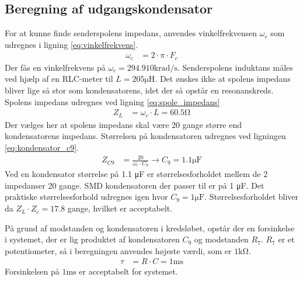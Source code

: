 \subsection{Beregning af udgangskondensator}
For at kunne finde senderspolens impedans, anvendes vinkelfrekvensen $\omega_c$ som udregnes i ligning \ref{eq:vinkelfrekvens}.
\begin{align}
	\omega_c & = 2 \cdot \pi \cdot F_c \label{eq:vinkelfrekvens}
\end{align}
Der fås en vinkelfrekvens på $\omega_c = 294.910 \si{\kilo\radian\per\second}$.
Senderspolens induktans måles ved hjælp af en RLC-meter til $L = 205 \si{\micro \henry}$.
Det ønskes ikke at spolens impedans bliver lige så stor som kondensatorens, idet der så opstår en resonanskreds. 
Spolens impedans udregnes ved ligning \ref{eq:spole_impedans}
\begin{align}
	Z_L & = \omega_c \cdot L = 60.5 \si{\ohm} \label{eq:spole_impedans}
\end{align}
Der vælges her at spolens impedans skal være 20 gange større end kondensatorens impedans. Størrelsen på kondensatoren udregnes ved ligningen \ref{eq:kondensator_c9}.
\begin{align}
	Z_{C9} & = \frac{20}{\omega_c \cdot C_9} \rightarrow C_9 = 1.1 \si{\micro\farad} \label{eq:kondensator_c9}
\end{align}
Ved en kondensator størrelse på 1.1 \si{\micro\farad} er størrelsesforholdet mellem de 2 impedanser 20 gange. 
SMD kondensatoren der passer til er på 1 \si{\micro\farad}. Det praktiske størrelsesforhold udregnes igen hvor $C_9 = 1 \si{\micro\farad}$. Størrelsesforholdet bliver da $Z_L \cdot Z_c = 17.8$ gange, hvilket er acceptabelt.

På grund af modstanden og kondensatoren i kredsløbet, opstår der en forsinkelse i systemet, der er lig produktet af kondensatoren $C_9$ og modstanden $R_7$. $R_7$ er et potentiometer, så i beregningen anvendes højeste værdi, som er $1\si{\kilo\ohm}$.
\begin{align}
	\tau & = R \cdot C = 1 \si{\milli\second}
\end{align}
Forsinkelsen på $1 \si{\milli\second}$ er acceptabelt for systemet.

